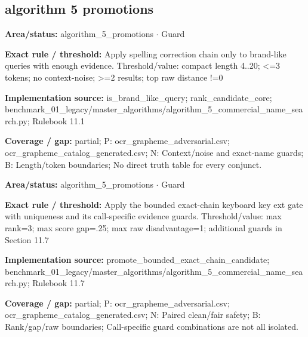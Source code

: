 \subsection*{algorithm 5 promotions}
\begin{tcolorbox}[enhanced,breakable,colback=white,colframe=Muted!45,boxrule=0.45pt,arc=1.5pt,left=6pt,right=6pt,top=5pt,bottom=5pt,title={\texttt{A5-BRAND-GATE-17}},title after break={\texttt{A5-BRAND-GATE-17}\ (continued)},fonttitle=\headingfont\bfseries\color{Navy},coltitle=Navy]
\textbf{Area/status:} algorithm\_\allowbreak{}5\_\allowbreak{}promotions $\boldsymbol{\cdot}$ Guard\par
\smallskip
\textbf{Exact rule / threshold:} Apply spelling correction chain only to brand-like queries with enough evidence. Threshold/\allowbreak{}value: compact length 4..20; <=3 tokens; no context-noise; >=2 results; top raw distance !=0\par
\smallskip
\textbf{Implementation source:} is\_\allowbreak{}brand\_\allowbreak{}like\_\allowbreak{}query; rank\_\allowbreak{}candidate\_\allowbreak{}core; benchmark\_\allowbreak{}01\_\allowbreak{}legacy/\allowbreak{}master\_\allowbreak{}algorithms/\allowbreak{}algorithm\_\allowbreak{}5\_\allowbreak{}commercial\_\allowbreak{}name\_\allowbreak{}search.py; Rulebook 11.1\par
\smallskip
\textbf{Coverage / gap:} partial; P: ocr\_\allowbreak{}grapheme\_\allowbreak{}adversarial.csv; ocr\_\allowbreak{}grapheme\_\allowbreak{}catalog\_\allowbreak{}generated.csv; N: Context/\allowbreak{}noise and exact-name guards; B: Length/\allowbreak{}token boundaries; No direct truth table for every conjunct.
\end{tcolorbox}
\begin{tcolorbox}[enhanced,breakable,colback=white,colframe=Muted!45,boxrule=0.45pt,arc=1.5pt,left=6pt,right=6pt,top=5pt,bottom=5pt,title={\texttt{A5-CHAIN-KEYBOARD-KEY-EXT}},title after break={\texttt{A5-CHAIN-KEYBOARD-KEY-EXT}\ (continued)},fonttitle=\headingfont\bfseries\color{Navy},coltitle=Navy]
\textbf{Area/status:} algorithm\_\allowbreak{}5\_\allowbreak{}promotions $\boldsymbol{\cdot}$ Guard\par
\smallskip
\textbf{Exact rule / threshold:} Apply the bounded exact-chain keyboard key ext gate with uniqueness and its call-specific evidence guards. Threshold/\allowbreak{}value: max rank=3; max score gap=.25; max raw disadvantage=1; additional guards in Section 11.7\par
\smallskip
\textbf{Implementation source:} promote\_\allowbreak{}bounded\_\allowbreak{}exact\_\allowbreak{}chain\_\allowbreak{}candidate; benchmark\_\allowbreak{}01\_\allowbreak{}legacy/\allowbreak{}master\_\allowbreak{}algorithms/\allowbreak{}algorithm\_\allowbreak{}5\_\allowbreak{}commercial\_\allowbreak{}name\_\allowbreak{}search.py; Rulebook 11.7\par
\smallskip
\textbf{Coverage / gap:} partial; P: ocr\_\allowbreak{}grapheme\_\allowbreak{}adversarial.csv; ocr\_\allowbreak{}grapheme\_\allowbreak{}catalog\_\allowbreak{}generated.csv; N: Paired clean/\allowbreak{}fair safety; B: Rank/\allowbreak{}gap/\allowbreak{}raw boundaries; Call-specific guard combinations are not all isolated.
\end{tcolorbox}
